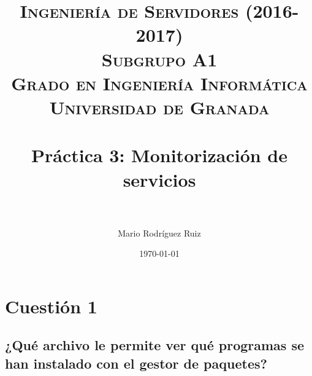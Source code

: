 


\title{	
\normalfont \normalsize 
\textsc{\textbf{Ingeniería de Servidores (2016-2017)} \\ Subgrupo A1 \\ Grado en Ingeniería Informática\\ Universidad de Granada} \\ [25pt] %
\horrule{0.5pt} \\[0.4cm] %
\huge Práctica 3: Monitorización de servicios \\ %
\horrule{2pt} \\[0.5cm] %
}

\author{Mario Rodríguez Ruiz} %

\date{\normalsize\today} %




\maketitle %

\newpage %

\tableofcontents %

\listoffigures

\newpage


\section{Cuestión 1}
\subsection{¿Qué archivo le permite ver qué programas se han
	instalado con el gestor de paquetes?}

